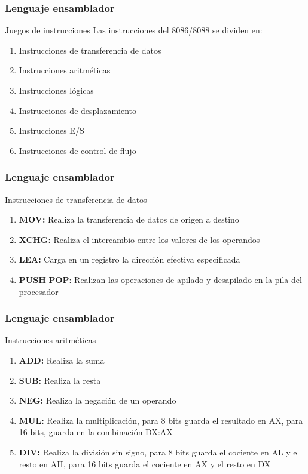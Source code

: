 \documentclass{beamer}
\begin{document}
\begin{frame}
	\frametitle{Lenguaje ensamblador}
	\begin{block}{Juegos de instrucciones}
		Las instrucciones del 8086/8088 se dividen en:
		\begin{enumerate}
			\item Instrucciones de transferencia de datos
			\item Instrucciones aritméticas
			\item Instrucciones lógicas
			\item Instrucciones de desplazamiento
			\item Instrucciones E/S
			\item Instrucciones de control de flujo
		\end{enumerate}
	\end{block}
\end{frame}

\begin{frame}
	\frametitle{Lenguaje ensamblador}
	\begin{block}{Instrucciones de transferencia de datos}
		\begin{enumerate}
			\item \textbf{MOV:} Realiza la transferencia de datos de origen a destino
			\item \textbf{XCHG:} Realiza el intercambio entre los valores de los operandos
			\item \textbf{LEA:} Carga en un registro la dirección efectiva especificada
			\item \textbf{PUSH} \textbf{POP}: Realizan las operaciones de apilado y desapilado en la pila del procesador
		\end{enumerate}
	\end{block}
\end{frame}

\begin{frame}
	\frametitle{Lenguaje ensamblador}
	\begin{block}{Instrucciones aritméticas}
		\begin{enumerate}
			\item \textbf{ADD:} Realiza la suma
			\item \textbf{SUB:} Realiza la resta
			\item \textbf{NEG:} Realiza la negación de un operando
			\item \textbf{MUL:} Realiza la multiplicación, para 8 bits guarda el resultado en AX, para 16 bits, guarda en la combinación DX:AX
			\item \textbf{DIV:} Realiza la división sin signo, para 8 bits guarda el cociente en AL y el resto en AH, para 16 bits guarda el cociente en AX y el resto en DX
		\end{enumerate}
	\end{block}
\end{frame}
\end{document}
